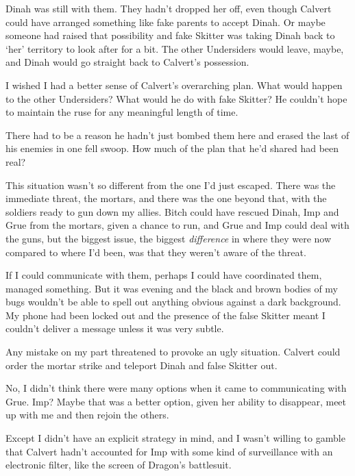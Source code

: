 Dinah was still with them.  They hadn't dropped her off, even though Calvert could have arranged something like fake parents to accept Dinah.  Or maybe someone had raised that possibility and fake Skitter was taking Dinah back to `her' territory to look after for a bit. The other Undersiders would leave, maybe, and Dinah would go straight back to Calvert's possession.



I wished I had a better sense of Calvert's overarching plan.  What would happen to the other Undersiders?  What would he do with fake Skitter?  He couldn't hope to maintain the ruse for any meaningful length of time.



There had to be a reason he hadn't just bombed them here and erased the last of his enemies in one fell swoop.  How much of the plan that he'd shared had been real?



This situation wasn't so different from the one I'd just escaped.  There was the immediate threat, the mortars, and there was the one beyond that, with the soldiers ready to gun down my allies.  Bitch could have rescued Dinah, Imp and Grue from the mortars, given a chance to run, and Grue and Imp could deal with the guns, but the biggest issue, the biggest \emph{difference} in where they were now compared to where I'd been, was that they weren't aware of the threat.



If I could communicate with them, perhaps I could have coordinated them, managed something.  But it was evening and the black and brown bodies of my bugs wouldn't be able to spell out anything obvious against a dark background.  My phone had been locked out and the presence of the false Skitter meant I couldn't deliver a message unless it was very subtle.



Any mistake on my part threatened to provoke an ugly situation.  Calvert could order the mortar strike and teleport Dinah and false Skitter out.



No, I didn't think there were many options when it came to communicating with Grue.  Imp?  Maybe that was a better option, given her ability to disappear, meet up with me and then rejoin the others.



Except I didn't have an explicit strategy in mind, and I wasn't willing to gamble that Calvert hadn't accounted for Imp with some kind of surveillance with an electronic filter, like the screen of Dragon's battlesuit.



